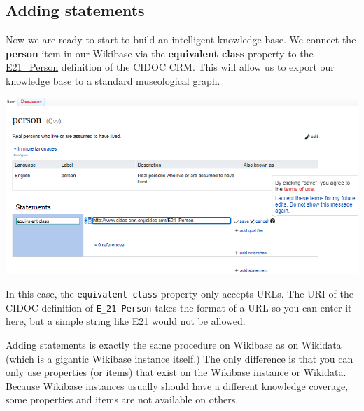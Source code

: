 \documentclass[
  letterpaper,
  DIV=11,
  numbers=noendperiod]{scrreprt}
\begin{document}
\subsection{Adding statements}\label{adding-statements}

Now we are ready to start to build an intelligent knowledge base. We
connect the \textbf{person} item in our Wikibase via the
\textbf{equivalent class} property to the
\href{https://www.cidoc-crm.org/html/cidoc_crm_v7.1.3.html\#E21}{E21\_Person}
definition of the CIDOC CRM. This will allow us to export our knowledge
base to a standard museological graph.

\begin{center}
\includegraphics{png/wikibase/edit/add_new_statement-1.png}
\end{center}

In this case, the \texttt{equivalent\ class} property only accepts URLs.
The URI of the CIDOC definition of \texttt{E\_21\ Person} takes the
format of a URL so you can enter it here, but a simple string like E21
would not be allowed.

\begin{tcolorbox}[enhanced jigsaw, opacityback=0, bottomrule=.15mm, rightrule=.15mm, toptitle=1mm, breakable, colbacktitle=quarto-callout-note-color!10!white, colback=white, title=\textcolor{quarto-callout-note-color}{\faInfo}\hspace{0.5em}{Note}, leftrule=.75mm, toprule=.15mm, left=2mm, arc=.35mm, colframe=quarto-callout-note-color-frame, coltitle=black, titlerule=0mm, bottomtitle=1mm, opacitybacktitle=0.6]

Adding statements is exactly the same procedure on Wikibase as on
Wikidata (which is a gigantic Wikibase instance itself.) The only
difference is that you can only use properties (or items) that exist on
the Wikibase instance or Wikidata. Because Wikibase instances usually
should have a different knowledge coverage, some properties and items
are not available on others.

\end{tcolorbox}
\end{document}
